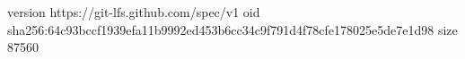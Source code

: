 version https://git-lfs.github.com/spec/v1
oid sha256:64c93bccf1939efa11b9992ed453b6cc34c9f791d4f78cfe178025e5de7e1d98
size 87560
